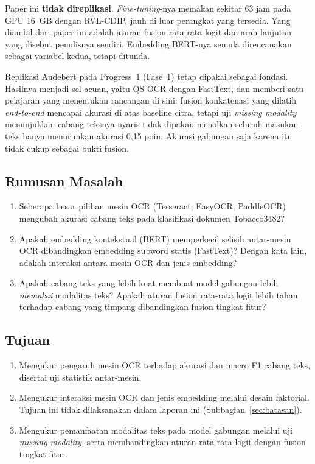 Paper ini \textbf{tidak direplikasi}. \textit{Fine-tuning}-nya memakan sekitar 63 jam
pada GPU 16~GB dengan RVL-CDIP, jauh di luar perangkat yang tersedia. Yang diambil dari
paper ini adalah aturan fusion rata-rata logit dan arah lanjutan yang disebut penulisnya
sendiri. Embedding BERT-nya semula direncanakan sebagai variabel kedua, tetapi ditunda.

Replikasi Audebert pada Progress~1 (Fase~1) tetap dipakai sebagai fondasi. Hasilnya
menjadi sel acuan, yaitu QS-OCR dengan FastText, dan memberi satu pelajaran yang menentukan
rancangan di sini: fusion konkatenasi yang dilatih \textit{end-to-end} mencapai akurasi di
atas baseline citra, tetapi uji \textit{missing modality} menunjukkan cabang teksnya nyaris
tidak dipakai: menolkan seluruh masukan teks hanya menurunkan akurasi 0,15 poin. Akurasi
gabungan saja karena itu tidak cukup sebagai bukti fusion.

\subsection{Rumusan Masalah}\label{sec:rumusan-masalah}

\begin{enumerate}[label=RM\arabic*.,leftmargin=1.2cm,labelwidth=1.2cm]
  \item Seberapa besar pilihan mesin OCR (Tesseract, EasyOCR, PaddleOCR) mengubah akurasi
  cabang teks pada klasifikasi dokumen Tobacco3482?
  \item Apakah embedding kontekstual (BERT) memperkecil selisih antar-mesin OCR
  dibandingkan embedding subword statis (FastText)? Dengan kata lain, adakah interaksi
  antara mesin OCR dan jenis embedding?
  \item Apakah cabang teks yang lebih kuat membuat model gabungan lebih \emph{memakai}
  modalitas teks? Apakah aturan fusion rata-rata logit lebih tahan terhadap cabang yang
  timpang dibandingkan fusion tingkat fitur?
\end{enumerate}

\subsection{Tujuan}\label{sec:tujuan}

\begin{enumerate}
  \item Mengukur pengaruh mesin OCR terhadap akurasi dan macro F1 cabang teks, disertai
  uji statistik antar-mesin.
  \item Mengukur interaksi mesin OCR dan jenis embedding melalui desain faktorial. Tujuan
  ini tidak dilaksanakan dalam laporan ini (Subbagian~\ref{sec:batasan}).
  \item Mengukur pemanfaatan modalitas teks pada model gabungan melalui uji
  \textit{missing modality}, serta membandingkan aturan rata-rata logit
  \parencite{kashyap2026} dengan fusion tingkat fitur.
\end{enumerate}

